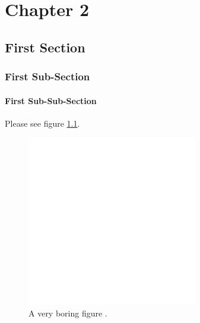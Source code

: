 \pagestyle{fancy}


\chapter{Chapter 2}


\section{First Section}


\subsection{First Sub-Section}


\subsubsection{First Sub-Sub-Section}

Please see figure \ref{fig:very_dull}.

\begin{figure}[b]
\begin{center}
\includegraphics*[scale=1.0]{chap2/temp.eps}
\end{center}
\caption[A dull figure.]{A very boring figure \citep{lukeabraham.com}.} 
\label{fig:very_dull}
\end{figure}


